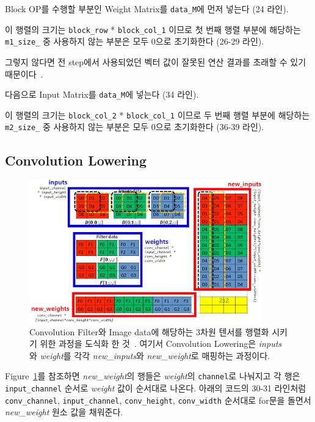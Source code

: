 \documentclass{article}
\begin{document}
\begin{itemize*}
\item Block OP를 수행할 부분인 Weight Matrix를 \texttt{data\_M}에 먼저 넣는다 (24 라인).
\item 이 행렬의 크기는 \texttt{block\_row} * \texttt{block\_col\_1} 이므로 첫 번째 행렬 부분에 해당하는 \texttt{m1\_size\_} 중 사용하지 않는 부분은 모두 0으로 초기화한다 (26-29 라인).
\begin{itemize*}
\item 그렇지 않다면 전 step에서 사용되었던 벡터 값이 잘못된 연산 결과를 초래할 수 있기 때문이다~\cite{lab2}.
\end{itemize*}
\item 다음으로 Input Matrix를 \texttt{data\_M}에 넣는다 (34 라인). 
\item 이 행렬의 크기는 \texttt{block\_col\_2} * \texttt{block\_col\_1} 이므로 두 번째 행렬 부분에 해당하는 \texttt{m2\_size\_} 중 사용하지 않는 부분은 모두 0으로 초기화한다 (36-39 라인).
\end{itemize*}

\newpage
\subsection{Convolution Lowering}

\begin{figure}[htb!]
	\centering
	\includegraphics[width=0.9\textwidth]{fig/convlow.jpg}
\caption{Convolution Filter와 Image data에 해당하는 3차원 텐서를 행렬화 시키기 위한 과정을 도식화 한 것~\cite{chetlur2014cudnn, lab9}. 여기서 Convolution Lowering은 \textit{inputs}와 \textit{weight}를 각각 \textit{new\_inputs}와 \textit{new\_weight}로 매핑하는 과정이다.}
\label{fig4}
\end{figure}

Figure~\ref{fig4}를 참조하면 \textit{new\_weight}의 행들은 \textit{weight}의 \texttt{channel}로 나눠지고 각 행은 \texttt{input\_channel} 순서로 \textit{weight} 값이 순서대로 나온다. 아래의 코드의 30-31 라인처럼 \texttt{conv\_channel}, \texttt{input\_channel}, \texttt{conv\_height}, \texttt{conv\_width} 순서대로 for문을 돌면서 \textit{new\_weight} 원소 값을 채워준다. \\
\end{document}
